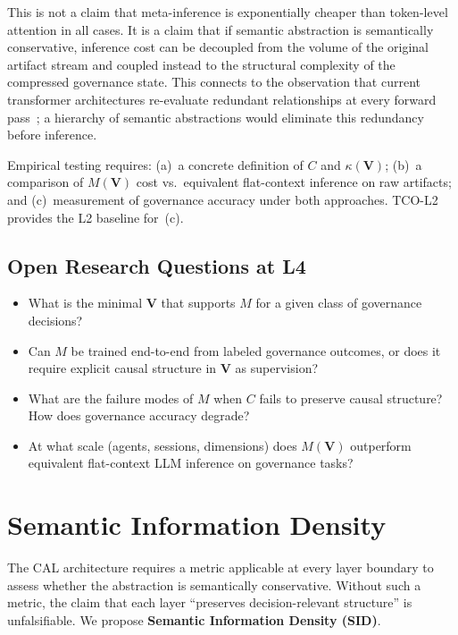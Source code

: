 \documentclass[11pt]{article}
\theoremstyle{definition}
\theoremstyle{remark}
\begin{document}
This is not a claim that meta-inference is exponentially cheaper than
token-level attention in all cases. It is a claim that if semantic
abstraction is semantically conservative, inference cost can be
decoupled from the volume of the original artifact stream and coupled
instead to the structural complexity of the compressed governance
state. This connects to the observation that current transformer
architectures re-evaluate redundant relationships at every forward
pass~\cite{tay2022efficient}; a hierarchy of semantic abstractions
would eliminate this redundancy before inference.

Empirical testing requires: (a)~a concrete definition of $C$ and
$\kappa(\mathbf{V})$; (b)~a comparison of $M(\mathbf{V})$ cost vs.\
equivalent flat-context inference on raw artifacts; and
(c)~measurement of governance accuracy under both approaches.
TCO-L2 provides the L2 baseline for~(c).

\subsection{Open Research Questions at L4}

\begin{itemize}[leftmargin=1.5em]
  \item What is the minimal $\mathbf{V}$ that supports $M$ for a
    given class of governance decisions?
  \item Can $M$ be trained end-to-end from labeled governance
    outcomes, or does it require explicit causal structure in
    $\mathbf{V}$ as supervision?
  \item What are the failure modes of $M$ when $C$ fails to preserve
    causal structure? How does governance accuracy degrade?
  \item At what scale (agents, sessions, dimensions) does
    $M(\mathbf{V})$ outperform equivalent flat-context LLM inference
    on governance tasks?
\end{itemize}

\section{Semantic Information Density}
\label{sec:sid}

The CAL architecture requires a metric applicable at every layer
boundary to assess whether the abstraction is semantically
conservative. Without such a metric, the claim that each layer
``preserves decision-relevant structure'' is unfalsifiable. We
propose \textbf{Semantic Information Density (SID)}.
\end{document}
